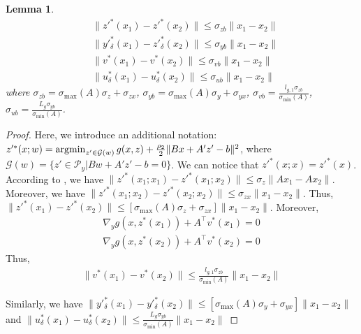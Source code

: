 \documentclass{article}
\newcommand{\Gc}{\mathcal{G}}
\newcommand{\Pc}{\mathcal{P}}
\newcommand{\argmin}{\mathop{\rm argmin}}
\theoremstyle{plain}
\newtheorem{lemma}[theorem]{Lemma}
\theoremstyle{definition}
\theoremstyle{remark}
\begin{document}
\begin{lemma}\label{lemma: sigma yb zb}
    \begin{align*}
        &\|z'^*(x_1)-z'^*(x_2)\|\leq \sigma_{zb}\|x_1-x_2\|\\
        &\|y'^*_\delta(x_1)-z'^*_\delta(x_2)\|\leq \sigma_{yb}\|x_1-x_2\|\\
        &\|v^*(x_1)-v^*(x_2)\|\leq \sigma_{vb}\|x_1-x_2\|\\
        &\|u^*_\delta(x_1)-u^*_\delta(x_2)\|\leq \sigma_{ub}\|x_1-x_2\|
    \end{align*}
    where $\sigma_{zb}=\sigma_{\max}(A)\sigma_z+\sigma_{zx}$, $\sigma_{yb}=\sigma_{\max}(A)\sigma_y+\sigma_{yx}$, $\sigma_{vb}=\frac{l_{g,1}\sigma_{zb}}{\sigma_{\min}(A)}$, $\sigma_{ub}=\frac{L_g\sigma_{yb}}{\sigma_{\min}(A)}$.
\end{lemma}
\begin{proof}
    Here, we introduce an additional notation: $z'^*(x; w)=\argmin_{z'\in \Gc(w)} g(x,z)+\frac{\rho_2}{2}\|Bx+A'z'-b\|^2$, where $\Gc(w)=\{z'\in \Pc_y | Bw+A'z'-b=0\}$. We can notice that $z'^*(x; x)=z'^*(x)$. According to , we have $\|z'^*(x_1; x_1)-z'^*(x_1; x_2)\|\leq \sigma_z\|Ax_1-Ax_2\|$. Moreover, we have $\|z'^*(x_1; x_2)-z'^*(x_2; x_2)\|\leq \sigma_{zx}\|x_1-x_2\|$. Thus, $\|z'^*(x_1)-z'^*(x_2)\|\leq [\sigma_{\max}(A)\sigma_z+\sigma_{zx}]\|x_1-x_2\|$.
    Moreover,
\begin{align*}
    \nabla_y g(x,z^*(x_1))+A^\top v^*(x_1)=0\\
    \nabla_y g(x,z^*(x_2))+A^\top v^*(x_2)=0
\end{align*}
Thus,
\begin{align*}
    \|v^*(x_1)-v^*(x_2)\|\leq \frac{l_{g,1}\sigma_{zb}}{\sigma_{\min}(A)}\|x_1-x_2\|
\end{align*}
    
    
    Similarly, we have $\|y'^*_\delta(x_1)-y'^*_\delta(x_2)\|\leq [\sigma_{\max}(A)\sigma_y+\sigma_{yx}]\|x_1-x_2\|$ and $\|u^*_\delta(x_1)-u^*_\delta(x_2)\|\leq \frac{L_g\sigma_{yb}}{\sigma_{\min}(A)}\|x_1-x_2\|$
\end{proof}
\end{document}
